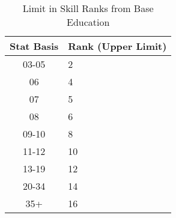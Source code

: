 
\begin{table}[h]
	\begin{tabular}{c|l}
	Stat Basis & Rank (Upper Limit) \\
	\hline
	03-05		& 2 \\
	06			& 4 \\
	07			& 5 \\
	08			& 6 \\
	09-10		& 8 \\
	11-12		& 10 \\
	13-19		& 12 \\
	20-34		& 14 \\
	35+			& 16 \\
    \end{tabular}
    \caption{Limit in Skill Ranks from Base Education} \label{Table:SkillLimit}
\end{table}

